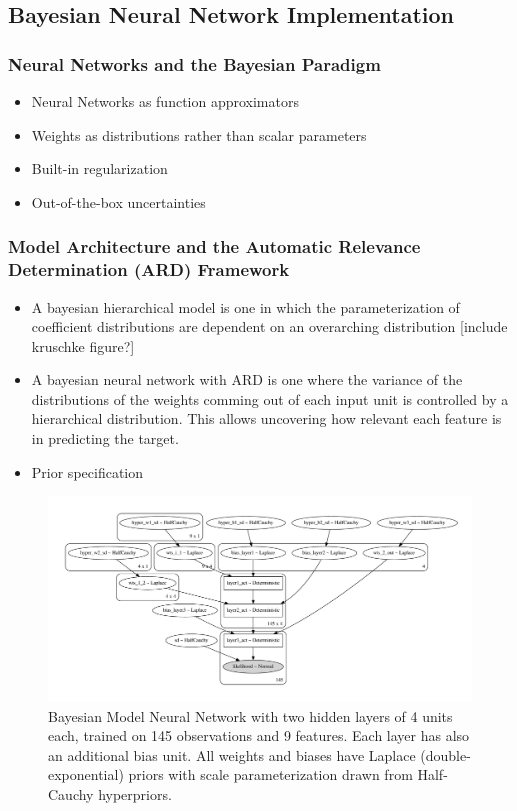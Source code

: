 \documentclass[10pt,a4paper]{article}
\begin{document}
		\subsection{Bayesian Neural Network Implementation}
			\subsubsection{Neural Networks and the Bayesian Paradigm}
				\begin{itemize}
					\item Neural Networks as function approximators
					\item Weights as distributions rather than scalar parameters
					\item Built-in regularization
					\item Out-of-the-box uncertainties
				\end{itemize}
			\subsubsection{Model Architecture and the Automatic Relevance Determination (ARD) Framework}
				\begin{itemize}
				    \item A bayesian hierarchical model is one in which the parameterization of coefficient distributions are dependent on an overarching distribution [include kruschke figure?]
				    \item A bayesian neural network with ARD is one where the variance of the distributions of the weights comming out of each input unit is controlled by a hierarchical distribution. This allows uncovering how relevant each feature is in predicting the target.
					\item Prior specification
				\end{itemize}
				\begin{figure}
				    \centering
				    \includegraphics[scale=0.4]{bnn_l2_4_4_robust.pdf}
				    \caption{Bayesian Model Neural Network with two hidden layers of 4 units each, trained on 145 observations and 9 features. Each layer has also an additional bias unit. All weights and biases have Laplace (double-exponential) priors with scale parameterization drawn from Half-Cauchy hyperpriors. }
				\end{figure}
\end{document}
